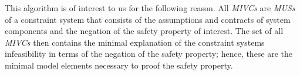 This algorithm is of interest to us for the following reason. All \textit{MIVCs} are \textit{MUSs} of a constraint system that consists of the assumptions and contracts of system components and the negation of the safety property of interest. The set of all \textit{MIVCs} then contains the minimal explanation of the constraint systems infeasibility in terms of the negation of the safety property; hence, these are the minimal model elements necessary to proof the safety property.

